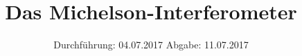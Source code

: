 

\subject{V408}
\title{\texorpdfstring{Das Michelson-Interferometer}{}}
\date{
	Durchführung: 04.07.2017
	\hspace{4em}
	Abgabe: 11.07.2017
}


	\maketitle
	\newpage
	\tableofcontents
	\newpage
	
	
	
	
	
	
	\newpage

	\printbibliography
